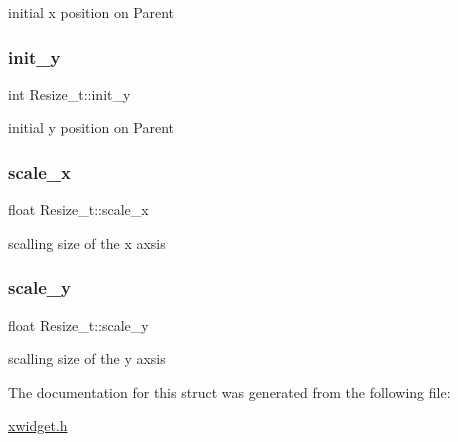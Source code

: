 initial x position on Parent \mbox{\label{structResize__t_a2f2c63ce1d407649d6b8daf4d6fbbb98}} 
\subsubsection{\texorpdfstring{init\+\_\+y}{init\_y}}
{\footnotesize\ttfamily int Resize\+\_\+t\+::init\+\_\+y}

initial y position on Parent \mbox{\label{structResize__t_a66246e7c08afdbe8f576ec4224a4fd3c}} 
\subsubsection{\texorpdfstring{scale\+\_\+x}{scale\_x}}
{\footnotesize\ttfamily float Resize\+\_\+t\+::scale\+\_\+x}

scalling size of the x axsis \mbox{\label{structResize__t_ab21caee367ce8e911c1e9b678d3d299e}} 
\subsubsection{\texorpdfstring{scale\+\_\+y}{scale\_y}}
{\footnotesize\ttfamily float Resize\+\_\+t\+::scale\+\_\+y}

scalling size of the y axsis 

The documentation for this struct was generated from the following file\+:\begin{DoxyCompactItemize}
\item 
\hyperlink{xwidget_8h}{xwidget.\+h}\end{DoxyCompactItemize}
